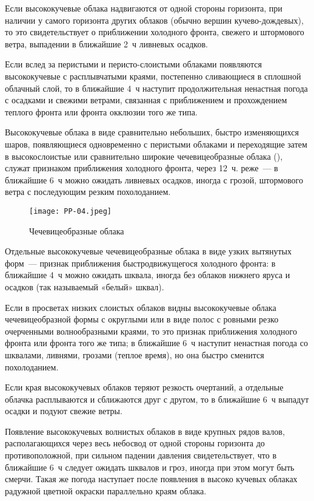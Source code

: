  Если высококучевые облака надвигаются от одной стороны
горизонта, при наличии у самого горизонта других облаков (обычно
вершин кучево-дождевых), то это свидетельствует о приближении
холодного фронта, свежего и штормового ветра, выпадении в ближайшие
2~ч ливневых осадков.

 Если вслед за перистыми и перисто-слоистыми облаками появляются
высококучевые с расплывчатыми краями, постепенно сливающиеся в
сплошной облачный слой, то в ближайшие 4~ч наступит
продолжительная ненастная погода с осадками и свежими ветрами,
связанная с приближением и прохождением теплого фронта или фронта
окклюзии того же типа.

 Высококучевые облака в виде сравнительно небольших, быстро
изменяющихся шаров, появляющиеся одновременно с перистыми облаками и
переходящие затем в высокослоистые или сравнительно широкие
чечевицеобразные облака (), служат признаком приближения
холодного фронта, через 12~ч. реже~--- в ближайшие 6~ч
можно ожидать ливневых осадков, иногда с грозой, штормового ветра с
последующим резким похолоданием.

\begin{figure}[htb]
  \centering{}
  \texttt{[image: PP-04.jpeg]}
  \caption{Чечевицеобразные облака}
  \label{fig:pp04}
  \small
  \centering{}
\end{figure}

 Отдельные высококучевые чечевицеобразные облака в виде узких
вытянутых форм~--- признак приближения быстродвижущегося холодного
фронта: в ближайшие 4~ч можно ожидать шквала, иногда без
облаков нижнего яруса и осадков (так называемый «белый» шквал).

 Если в просветах низких слоистых облаков видны высококучевые
облака чечевицеобразной формы с округлыми или в виде полос с ровными
резко очерченными волнообразными краями, то это признак приближения
холодного фронта или фронта того же типа; в ближайшие 6~ч наступит
ненастная погода со шквалами, ливнями, грозами (теплое время), но она
быстро сменится похолоданием.

 Если края высококучевых облаков теряют резкость очертаний, а
отдельные облачка расплываются и сближаются друг с другом, то в
ближайшие 6~ч выпадут осадки и подуют свежие ветры.

 Появление высококучевых волнистых облаков в виде крупных рядов
валов, располагающихся через весь небосвод от одной стороны горизонта
до противоположной, при сильном падении давления свидетельствует, что
в ближайшие 6~ч следует ожидать шквалов и гроз, иногда при этом
могут быть смерчи. Такая же погода наступает после появления в высоко
кучевых облаках радужной цветной окраски параллельно краям облака.

